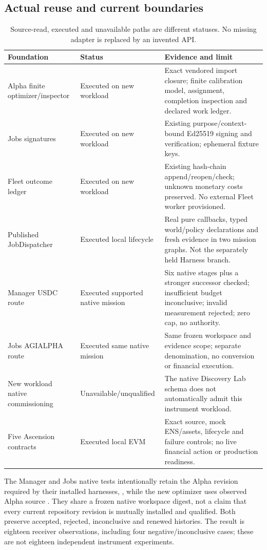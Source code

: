 \subsection{Actual reuse and current boundaries}
\begin{table}[H]\small\renewcommand{\arraystretch}{1.15}
\begin{tabularx}{\textwidth}{@{}>{\raggedright\arraybackslash}p{}>{\raggedright\arraybackslash}p{}>{\raggedright\arraybackslash}X@{}}\toprule
Foundation & Status & Evidence and limit\\\midrule
Alpha finite optimizer/inspector & Executed on new workload & Exact vendored import closure; finite calibration model, assignment, completion inspection and declared work ledger.\\
Jobs signatures & Executed on new workload & Existing purpose/context-bound Ed25519 signing and verification; ephemeral fixture keys.\\
Fleet outcome ledger & Executed on new workload & Existing hash-chain append/reopen/check; unknown monetary costs preserved. No external Fleet worker provisioned.\\
Published JobDispatcher & Executed local lifecycle & Real pure callbacks, typed world/policy declarations and fresh evidence in two mission graphs. Not the separately held Harness branch.\\
Manager USDC route & Executed supported native mission & Six native stages plus a stronger successor checked; insufficient budget inconclusive; invalid measurement rejected; zero cap, no authority.\\
Jobs AGIALPHA route & Executed same native mission & Same frozen workspace and evidence scope; separate denomination, no conversion or financial execution.\\
New workload native commissioning & Unavailable/unqualified & The native Discovery Lab schema does not automatically admit this instrument workload.\\
Five Ascension contracts & Executed local EVM & Exact source, mock ENS/assets, lifecycle and failure controls; no live financial action or production readiness.\\\bottomrule
\end{tabularx}
\caption{Source-read, executed and unavailable paths are different statuses. No missing adapter is replaced by an invented API.}
\end{table}

The Manager and Jobs native tests intentionally retain the Alpha revision required by their installed harnesses, , while the new optimizer uses observed Alpha source . They share a frozen native workspace digest, not a claim that every current repository revision is mutually installed and qualified. Both preserve accepted, rejected, inconclusive and renewed histories. The result is eighteen receiver observations, including four negative/inconclusive cases; these are not eighteen independent instrument experiments.

